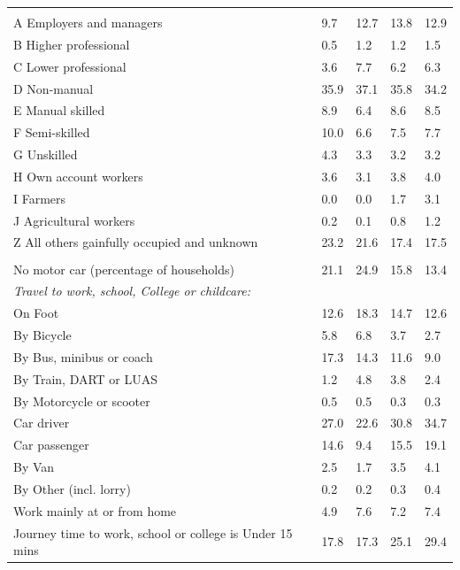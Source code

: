 \documentclass{article}
\begin{document}
\begin{table}[h]
\begin{tabular}{KTTTT}
\hline
    \\ 
    \hline
A Employers and managers &  9.7& 12.7& 13.8& 12.9\\
B Higher professional & 0.5& 1.2& 1.2& 1.5\\
C Lower professional & 3.6& 7.7& 6.2& 6.3\\
D Non-manual & 35.9& 37.1& 35.8& 34.2\\
E Manual skilled & 8.9& 6.4& 8.6& 8.5\\
F Semi-skilled & 10.0&  6.6&  7.5&  7.7\\
G Unskilled & 4.3& 3.3& 3.2& 3.2\\
H Own account workers & 3.6& 3.1& 3.8& 4.0\\
I Farmers & 0.0& 0.0& 1.7& 3.1\\
J Agricultural workers & 0.2& 0.1& 0.8& 1.2\\
Z All others gainfully occupied and unknown & 23.2& 21.6& 17.4& 17.5\\
\hline
{}\hline
    \\ 
    \hline
No motor car (percentage of households) & 21.1& 24.9& 15.8& 
13.4\\
    \hline 
\emph{Travel to work, school, College or childcare:} & & & \\
\quad On Foot & 12.6& 18.3& 14.7& 12.6\\ 
\quad By Bicycle & 5.8& 6.8& 3.7& 2.7\\ 
\quad By Bus, minibus or coach & 17.3& 14.3& 11.6&  9.0\\
\quad By Train, DART or LUAS & 1.2& 4.8& 3.8& 2.4\\
\quad By Motorcycle or scooter & 0.5& 0.5& 0.3& 0.3\\
\quad Car driver & 27.0 & 22.6& 30.8& 34.7\\
\quad Car passenger & 14.6&  9.4& 15.5& 19.1\\
\quad By Van & 2.5& 1.7& 3.5& 4.1\\
\quad By Other (incl. lorry) & 0.2& 0.2& 0.3& 0.4\\
    \hline
Work mainly at or from home & 4.9& 7.6& 7.2& 7.4\\
Journey time to work, school or college is Under 15 mins & 17.8& 17.3& 25.1& 29.4\\

\end{tabular}
\end{table}
\end{document}
